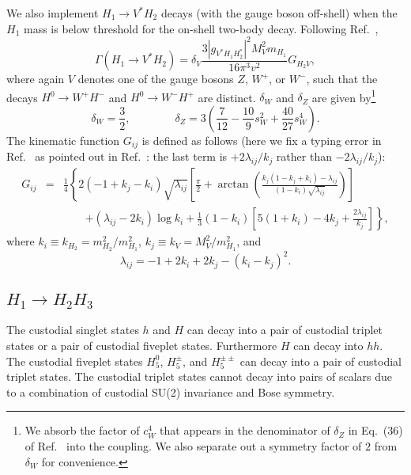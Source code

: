 \documentclass[11pt]{article}
\begin{document}
We also implement $H_1 \to V^* H_2$ decays (with the gauge boson off-shell) when the $H_1$ mass is below threshold for the on-shell two-body decay.  Following Ref.~\cite{Djouadi:1995gv},
\begin{equation}
	\Gamma(H_1 \to V^* H_2) = \delta_V \frac{3 |g_{V^* H_1 H_2^*} |^2 M_V^2 m_{H_1}}
	{16 \pi^3 v^2} G_{H_2 V},
\end{equation}
where again $V$ denotes one of the gauge bosons $Z$, $W^+$, or $W^-$, such that the decays $H^0 \to W^+ H^-$ and $H^0 \to W^- H^+$ are distinct.  $\delta_W$ and $\delta_Z$ are given by\footnote{We absorb the factor of $c_W^4$ that appears in the denominator of $\delta_Z$ in Eq.~(36) of Ref.~\cite{Djouadi:1995gv} into the coupling.  We also separate out a symmetry factor of $2$ from $\delta_W$ for convenience.}
\begin{equation}
	\delta_W = \frac{3}{2}, \qquad \qquad
	\delta_Z = 3 \left( \frac{7}{12} - \frac{10}{9} s_W^2 + \frac{40}{27} s_W^4 \right).
\end{equation}
The kinematic function $G_{ij}$ is defined as follows (here we fix a typing error in Ref.~\cite{Djouadi:1995gv} as pointed out in Ref.~\cite{Akeroyd:1998dt}: the last term is $+2 \lambda_{ij}/k_j$ rather than $-2 \lambda_{ij}/k_j$):
\begin{eqnarray}
	G_{ij} &=& \frac{1}{4} \left\{ 2 (-1 + k_j - k_i) \sqrt{\lambda_{ij}} 
	\left[ \frac{\pi}{2} + \arctan \left( \frac{k_j (1 - k_j + k_i) - \lambda_{ij}}{(1 - k_i) \sqrt{\lambda_{ij}}} \right) \right] \right. \nonumber \\
	&& \qquad \left. + (\lambda_{ij} - 2 k_i) \log k_i 
	+ \frac{1}{3} (1 - k_i) \left[ 5 (1 + k_i) - 4 k_j + \frac{2 \lambda_{ij}}{k_j} \right] \right\},
\end{eqnarray}
where $k_i \equiv k_{H_2} = m_{H_2}^2/m_{H_1}^2$, $k_j \equiv k_V = M_V^2/m_{H_1}^2$, and 
\begin{equation}
	\lambda_{ij} = -1 + 2 k_i + 2 k_j - (k_i - k_j)^2.
\end{equation}

\subsection{$H_1 \to H_2 H_3$}

The custodial singlet states $h$ and $H$ can decay into a pair of custodial triplet states or a pair of custodial fiveplet states.  Furthermore $H$ can decay into $hh$.  The custodial fiveplet states $H_5^0$, $H_5^{\pm}$, and $H_5^{\pm \pm}$ can decay into a pair of custodial triplet states.  The custodial triplet states cannot decay into pairs of scalars due to a combination of custodial SU(2) invariance and Bose symmetry.
\end{document}
